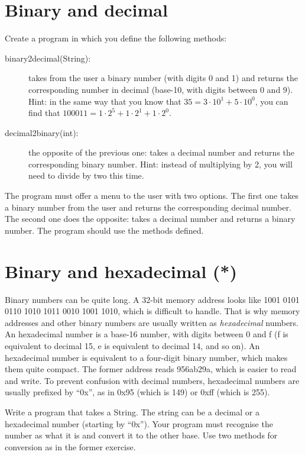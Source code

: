 \documentclass{article}
\begin{document}
\section{Binary and decimal}
\label{sec:from-10011-19}

Create a program in which you define the following methods: 

\begin{description}
\item[binary2decimal(String):] takes from the user a binary number
  (with digits 0 and 1) and returns the corresponding number in
  decimal (base-10, with digits between 0 and 9).  Hint: in the same
  way that you know that $35 = 3 \cdot 10^1 + 5 \cdot 10^0$, you can find that
  $100011 = 1 \cdot 2^5 + 1 \cdot 2^1 + 1 \cdot 2^0$.
\item[decimal2binary(int):] the opposite of the previous one: takes a
  decimal number and returns the corresponding binary number.  Hint:
  instead of multiplying by 2, you will need to divide by two this
  time.
\end{description}

The program must offer a menu to the user with two options. 
The first one takes a binary number from the
user and returns the corresponding decimal number. The second one does
the opposite: takes a decimal number and returns a binary number. The
program should use the methods defined. 

\section{Binary and hexadecimal (*)}
\label{sec:c}

Binary numbers can be quite long. A 32-bit memory address looks like
1001 0101 0110 1010 1011 0010 1001 1010, which is difficult to
handle. That is why memory addresses and other binary numbers are
usually written as \emph{hexadecimal} numbers. An hexadecimal number
is a base-16 number, with digits between 0 and f (f is equivalent to
decimal 15, e is equivalent to decimal 14, and so on). An hexadecimal
number is equivalent to a four-digit binary number, which makes them
quite compact. The former address reads 956ab29a, which is easier to
read and write. To prevent confusion with decimal numbers, hexadecimal
numbers are usually prefixed by ``0x'', as in 0x95 (which is 149) or
0xff (which is 255). 

Write a program that takes a String. The string can be a decimal or a
hexadecimal number (starting by ``0x''). Your program must recognise
the number as what it is and convert it to the other base. Use two
methods for conversion as in the former exercise. 
\end{document}
